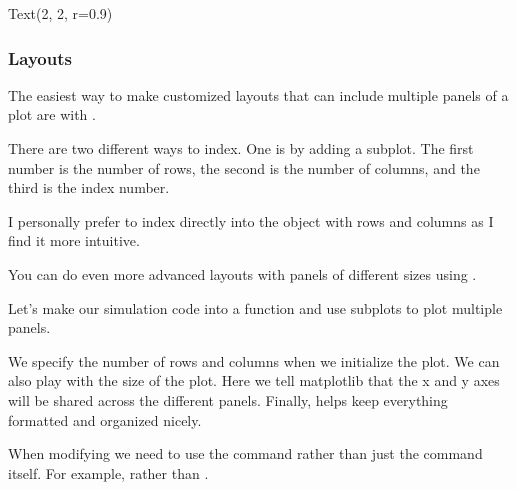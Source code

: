 \documentclass[letterpaper,10pt,english]{sphinxmanual}
\begin{document}
\begin{sphinxVerbatim}[commandchars=\\\{\}]
Text(\PYGZhy{}2, 2, \PYGZsq{}r=0.9\PYGZsq{})
\end{sphinxVerbatim}

\noindent{}


\subsubsection{Layouts}
\label{\detokenize{content/Introduction_to_Plotting:layouts}}
The easiest way to make customized layouts that can include multiple panels of a plot are with .


There are two different ways to index. One is by adding a subplot. The first number is the number of rows, the second is the number of columns, and the third is the index number.

I personally prefer to index directly into the  object with rows and columns as I find it more intuitive.

You can do even more advanced layouts with panels of different sizes using .

Let’s make our simulation code into a function and use subplots to plot multiple panels.

We specify the number of rows and columns when we initialize the plot. We can also play with the size of the plot. Here we tell matplotlib that the x and y axes will be shared across the different panels. Finally,  helps keep everything formatted and organized nicely.

When modifying  we need to use the  command rather than just the command itself. For example,  rather than .
\end{document}
